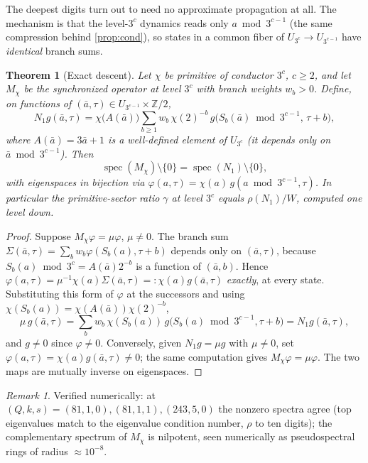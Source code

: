\documentclass[11pt]{article}
\newcommand{\Z}{\mathbb{Z}}
\theoremstyle{plain}
\newtheorem{theorem}{Theorem}
\theoremstyle{definition}
\theoremstyle{remark}
\newtheorem*{remark}{Remark}
\begin{document}
The deepest digits turn out to need no approximate propagation at all. The
mechanism is that the level-$3^c$ dynamics reads only $a\bmod3^{c-1}$ (the same
compression behind \cref{prop:cond}), so states in a common fiber of
$U_{3^c}\to U_{3^{c-1}}$ have \emph{identical} branch sums.

\begin{theorem}[Exact descent]\label{thm:descent}
Let $\chi$ be primitive of conductor $3^c$, $c\ge2$, and let $M_\chi$ be the
synchronized operator at level $3^c$ with branch weights $w_b>0$. Define, on
functions of $(\bar a,\tau)\in U_{3^{c-1}}\times\Z/2$,
\[
N_1g(\bar a,\tau)=\chi\bigl(A(\bar a)\bigr)\sum_{b\ge1}w_b\,\chi(2)^{-b}\,
g\bigl(S_b(\bar a)\bmod3^{c-1},\,\tau+b\bigr),
\]
where $A(\bar a)=3\bar a+1$ is a well-defined element of $U_{3^c}$ (it depends
only on $\bar a\bmod3^{c-1}$). Then
\[
\operatorname{spec}(M_\chi)\setminus\{0\}
=\operatorname{spec}(N_1)\setminus\{0\},
\]
with eigenspaces in bijection via $\varphi(a,\tau)=\chi(a)\,g(a\bmod3^{c-1},\tau)$.
In particular the primitive-sector ratio $\gamma$ at level $3^c$ equals
$\rho(N_1)/W$, computed one level down.
\end{theorem}
\begin{proof}
Suppose $M_\chi\varphi=\mu\varphi$, $\mu\ne0$. The branch sum
$\Sigma(\bar a,\tau)=\sum_bw_b\varphi(S_b(a),\tau+b)$ depends only on
$(\bar a,\tau)$, because $S_b(a)\bmod3^c=A(\bar a)2^{-b}$ is a function of
$(\bar a,b)$. Hence
$\varphi(a,\tau)=\mu^{-1}\chi(a)\Sigma(\bar a,\tau)=:\chi(a)g(\bar a,\tau)$
\emph{exactly}, at every state. Substituting this form of $\varphi$ at the
successors and using
$\chi(S_b(a))=\chi(A(\bar a))\chi(2)^{-b}$,
\[
\mu\,g(\bar a,\tau)=\sum_bw_b\,\chi(S_b(a))\,g\bigl(S_b(a)\bmod3^{c-1},\tau+b\bigr)
=N_1g(\bar a,\tau),
\]
and $g\ne0$ since $\varphi\ne0$. Conversely, given $N_1g=\mu g$ with $\mu\ne0$,
set $\varphi(a,\tau)=\chi(a)g(\bar a,\tau)\ne0$; the same computation gives
$M_\chi\varphi=\mu\varphi$. The two maps are mutually inverse on eigenspaces.
\end{proof}

\begin{remark}
Verified numerically: at $(Q,k,s)=(81,1,0),(81,1,1),(243,5,0)$ the nonzero
spectra agree (top eigenvalues match to the eigenvalue condition number,
$\rho$ to ten digits); the complementary spectrum of $M_\chi$ is nilpotent, seen
numerically as pseudospectral rings of radius $\approx10^{-8}$.
\end{remark}
\end{document}
